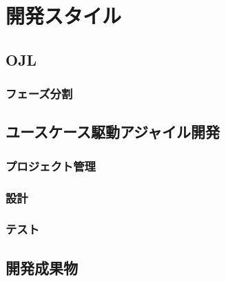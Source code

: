 \chapter{開発スタイル}

\section{OJL}

\subsection{フェーズ分割}

\section{ユースケース駆動アジャイル開発}

\subsection{プロジェクト管理}

\subsection{設計}

\subsection{テスト}

\section{開発成果物}
